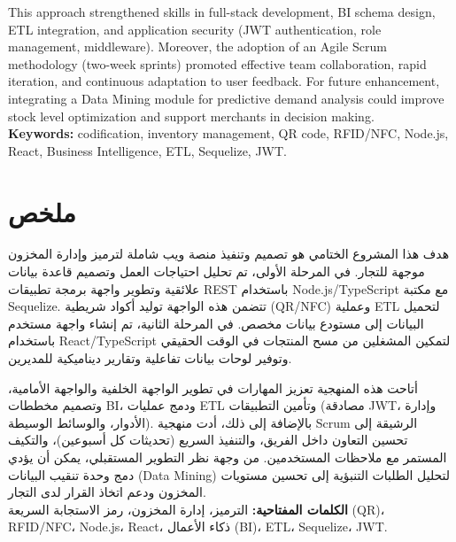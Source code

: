 \documentclass[12pt,a4paper]{report}
\begin{document}
This approach strengthened skills in full-stack development, BI schema design, ETL integration, and application security (JWT authentication, role management, middleware). Moreover, the adoption of an Agile Scrum methodology (two-week sprints) promoted effective team collaboration, rapid iteration, and continuous adaptation to user feedback. For future enhancement, integrating a Data Mining module for predictive demand analysis could improve stock level optimization and support merchants in decision making.\\
\textbf{Keywords:} codification, inventory management, QR code, RFID/NFC, Node.js, React, Business Intelligence, ETL, Sequelize, JWT.

\cleardoublepage
{}
\chapter*{ملخص}
هدف هذا المشروع الختامي هو تصميم وتنفيذ منصة ويب شاملة لترميز وإدارة المخزون موجهة للتجار. في المرحلة الأولى، تم تحليل احتياجات العمل وتصميم قاعدة بيانات علائقية وتطوير واجهة برمجة تطبيقات REST باستخدام Node.js/TypeScript مع مكتبة Sequelize. تتضمن هذه الواجهة توليد أكواد شريطية (QR/NFC) وعملية ETL لتحميل البيانات إلى مستودع بيانات مخصص. في المرحلة الثانية، تم إنشاء واجهة مستخدم باستخدام React/TypeScript لتمكين المشغلين من مسح المنتجات في الوقت الحقيقي وتوفير لوحات بيانات تفاعلية وتقارير ديناميكية للمديرين.  

أتاحت هذه المنهجية تعزيز المهارات في تطوير الواجهة الخلفية والواجهة الأمامية، وتصميم مخططات BI، ودمج عمليات ETL وتأمين التطبيقات (مصادقة JWT، وإدارة الأدوار، والوسائط الوسيطة). بالإضافة إلى ذلك، أدت منهجية Scrum الرشيقة إلى تحسين التعاون داخل الفريق، والتنفيذ السريع (تحديثات كل أسبوعين)، والتكيف المستمر مع ملاحظات المستخدمين. من وجهة نظر التطوير المستقبلي، يمكن أن يؤدي دمج وحدة تنقيب البيانات (Data Mining) لتحليل الطلبات التنبؤية إلى تحسين مستويات المخزون ودعم اتخاذ القرار لدى التجار.\\
\textbf{الكلمات المفتاحية:} الترميز، إدارة المخزون، رمز الاستجابة السريعة (QR)، RFID/NFC، Node.js، React، ذكاء الأعمال (BI)، ETL، Sequelize، JWT.


\cleardoublepage
\tableofcontents
\listoffigures
\listoftables
\cleardoublepage
\end{document}
